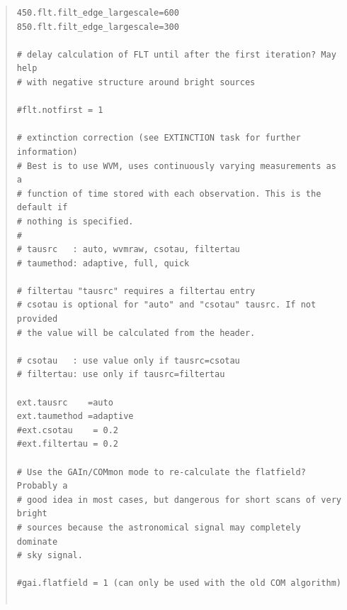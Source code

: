 \documentclass[twoside,11pt]{article}
\renewcommand{\_}{\texttt{\symbol{95}}}
\newenvironment{myquote}{\begin{quote}\begin{small}}{\end{small}\end{quote}}
\begin{document}
\begin{myquote}
\begin{verbatim}
450.flt.filt_edge_largescale=600
850.flt.filt_edge_largescale=300

# delay calculation of FLT until after the first iteration? May help
# with negative structure around bright sources

#flt.notfirst = 1

# extinction correction (see EXTINCTION task for further information)
# Best is to use WVM, uses continuously varying measurements as a
# function of time stored with each observation. This is the default if
# nothing is specified.
#
# tausrc   : auto, wvmraw, csotau, filtertau
# taumethod: adaptive, full, quick

# filtertau "tausrc" requires a filtertau entry
# csotau is optional for "auto" and "csotau" tausrc. If not provided
# the value will be calculated from the header.

# csotau   : use value only if tausrc=csotau
# filtertau: use only if tausrc=filtertau

ext.tausrc    =auto
ext.taumethod =adaptive
#ext.csotau    = 0.2
#ext.filtertau = 0.2

# Use the GAIn/COMmon mode to re-calculate the flatfield? Probably a
# good idea in most cases, but dangerous for short scans of very bright
# sources because the astronomical signal may completely dominate
# sky signal.

#gai.flatfield = 1 (can only be used with the old COM algorithm)


\end{verbatim}
\end{myquote}
\end{document}
